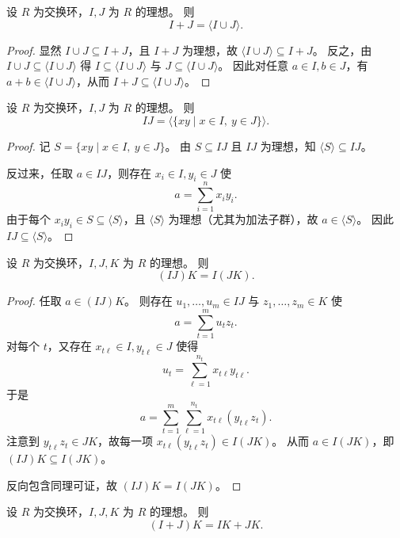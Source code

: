 \documentclass[lang=cn,a4paper,newtx]{elegantbook}
\begin{document}
\begin{proposition}
  设 $R$ 为交换环，$I,J$ 为 $R$ 的理想。
  则
  \[
    I+J=\langle I\cup J\rangle.
  \]
\end{proposition}

\begin{proof}
  显然 $I\cup J\subseteq I+J$，且 $I+J$ 为理想，故 $\langle I\cup J\rangle\subseteq I+J$。
  反之，由 $I\cup J\subseteq \langle I\cup J\rangle$ 得 $I\subseteq \langle I\cup J\rangle$ 与 $J\subseteq \langle I\cup J\rangle$。
  因此对任意 $a\in I,b\in J$，有 $a+b\in \langle I\cup J\rangle$，从而 $I+J\subseteq \langle I\cup J\rangle$。
\end{proof}

\begin{proposition}
  设 $R$ 为交换环，$I,J$ 为 $R$ 的理想。
  则
  \[
    IJ=\bigl\langle\{xy\mid x\in I,\ y\in J\}\bigr\rangle.
  \]
\end{proposition}

\begin{proof}
  记 $S=\{xy\mid x\in I,\ y\in J\}$。
  由 $S\subseteq IJ$ 且 $IJ$ 为理想，知 $\langle S\rangle\subseteq IJ$。

  反过来，任取 $a\in IJ$，则存在 $x_i\in I,y_i\in J$ 使
  \[
    a=\sum_{i=1}^n x_i y_i.
  \]
  由于每个 $x_i y_i\in S\subseteq \langle S\rangle$，且 $\langle S\rangle$ 为理想（尤其为加法子群），故 $a\in \langle S\rangle$。
  因此 $IJ\subseteq \langle S\rangle$。
\end{proof}

\begin{proposition}
  设 $R$ 为交换环，$I,J,K$ 为 $R$ 的理想。
  则
  \[
    (IJ)K=I(JK).
  \]
\end{proposition}

\begin{proof}
  任取 $a\in (IJ)K$。
  则存在 $u_1,\dots,u_m\in IJ$ 与 $z_1,\dots,z_m\in K$ 使
  \[
    a=\sum_{t=1}^m u_t z_t.
  \]
  对每个 $t$，又存在 $x_{t\ell}\in I,y_{t\ell}\in J$ 使得
  \[
    u_t=\sum_{\ell=1}^{n_t} x_{t\ell}y_{t\ell}.
  \]
  于是
  \[
    a=\sum_{t=1}^m \sum_{\ell=1}^{n_t} x_{t\ell}(y_{t\ell}z_t).
  \]
  注意到 $y_{t\ell}z_t\in JK$，故每一项 $x_{t\ell}(y_{t\ell}z_t)\in I(JK)$。
  从而 $a\in I(JK)$，即 $(IJ)K\subseteq I(JK)$。

  反向包含同理可证，故 $(IJ)K=I(JK)$。
\end{proof}

\begin{proposition}\label{ideal-distrib}
  设 $R$ 为交换环，$I,J,K$ 为 $R$ 的理想。
  则
  \[
    (I+J)K=IK+JK.
  \]
\end{proposition}
\end{document}
